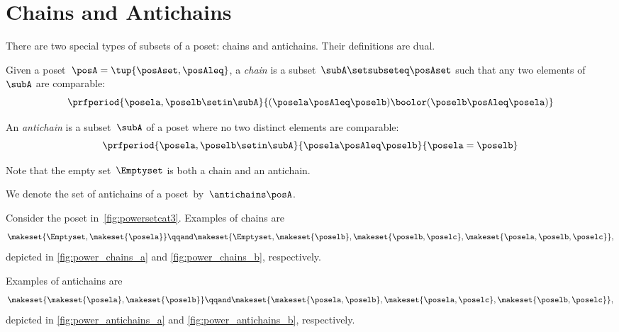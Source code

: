 
\section{Chains and Antichains}
\label{sec:chains-antichains}

There are two special types of subsets of a poset: chains and antichains.
Their definitions are dual.

\begin{definition}
    \label{def:chain}
    Given a poset~$\posA = \tup{\posAset, \posAleq}$, a \emph{chain} is a subset~$\subA \setsubseteq \posAset$ such that any two elements of~$\subA$ are comparable:
    \begin{equation}\label{eq:chain}
        \prfperiod{
            \posela,\poselb \setin \subA
        }{
            (\posela \posAleq  \poselb) \boolor (\poselb \posAleq  \posela)
        }
    \end{equation}
\end{definition}

\begin{definition}
    \label{def:antichain}
    An \emph{antichain} is a subset~$\subA$ of a poset where no two distinct elements are comparable:
    \begin{equation}\label{eq:antichain}
        \prfperiod{
            \posela, \poselb \setin \subA
        }{
            \posela \posAleq \poselb
        }{
            \posela = \poselb
        }
    \end{equation}
\end{definition}
\begin{remark}
    Note that the empty set~$\Emptyset$ is both a chain and an antichain.
\end{remark}

We denote the set of antichains of a poset~\posA by~$\antichains\posA$.

\begin{example}
    Consider the poset in~\cref{fig:powersetcat3}.
    Examples of chains are
    \begin{equation}\label{eq:example-chain}
        \makeset{\Emptyset,\makeset{\posela}}
        \qqand
        \makeset{\Emptyset,\makeset{\poselb},\makeset{\poselb,\poselc},\makeset{\posela,\poselb,\poselc}},
    \end{equation}
    depicted in \cref{fig:power_chains_a} and \cref{fig:power_chains_b}, respectively.

    Examples of antichains are
    \begin{equation}\label{eq:examples-antichain}
        \makeset{\makeset{\posela},\makeset{\poselb}}
        \qqand
        \makeset{\makeset{\posela,\poselb}, \makeset{\posela,\poselc}, \makeset{\poselb,\poselc}},
    \end{equation}
    depicted in \cref{fig:power_antichains_a} and \cref{fig:power_antichains_b}, respectively.
\end{example}

